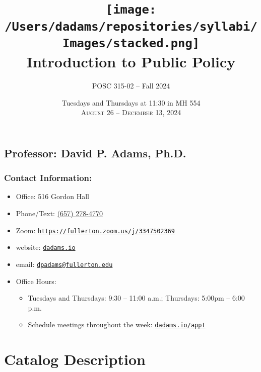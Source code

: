 \documentclass[12pt, letterpaper]{article}
\begin{document}
\title{\texttt{[image: /Users/dadams/repositories/syllabi/Images/stacked.png]} \\\vspace{1ex} \textbf{Introduction to Public Policy}}

\author{POSC 315-02 -- Fall 2024}
\date{Tuesdays and Thursdays at 11:30 in MH 554 \\\vspace{2ex} \textsc{August 26 -- December 13, 2024}}

    \maketitle


\subsection*{Professor: David P. Adams, Ph.D.}

\subsubsection*{Contact Information:}

\begin{itemize}
	\item Office: 516 Gordon Hall
	\item Phone/Text: \href{tel:+16572784770}{(657) 278-4770}
	\item Zoom: \href{https://fullerton.zoom.us/j/3347502369}{\texttt{https://fullerton.zoom.us/j/3347502369}}
	\item website: \href{https://dadams.io}{\texttt{dadams.io}}
	\item email: \href{dpadams@fullerton.edu}{\texttt{dpadams@fullerton.edu}}
	\item Office Hours:
        \begin{itemize}
            \item Tuesdays and Thursdays: 9:30 -- 11:00 a.m.; Thursdays: 5:00pm -- 6:00 p.m.
            \item Schedule meetings throughout the week: \href{https://dadams.io/appt}{\texttt{dadams.io/appt}}
        \end{itemize}  
\end{itemize}


\section{Catalog Description}
\end{document}
